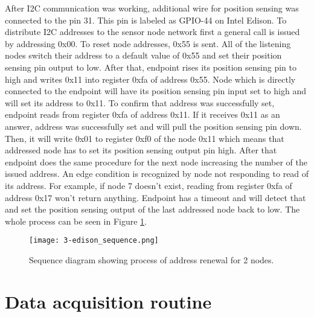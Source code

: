 After \ac{I2C} communication was working, additional wire for position sensing was connected to the pin 31. This pin is labeled as GPIO-44 on Intel Edison. To distribute \ac{I2C} addresses to the sensor node network first a general call is issued by addressing 0x00. To reset node addresses, 0x55 is sent. All of the listening nodes switch their address to a default value of 0x55 and set their position sensing pin output to low. After that, endpoint rises its position sensing pin to high and writes 0x11 into register 0xfa of address 0x55. Node which is directly connected to the endpoint will have its position sensing pin input set to high and will set its address to 0x11. To confirm that address was successfully set, endpoint reads from register 0xfa of address 0x11. If it receives 0x11 as an answer, address was successfully set and will pull the position sensing pin down. Then, it will write 0x01 to register 0xf0 of the node 0x11 which means that addressed node has to set its position sensing output pin high. After that endpoint does the same procedure for the next node increasing the number of the issued address. An edge condition is recognized by node not responding to read of its address. For example, if node 7 doesn't exist, reading from register 0xfa of address 0x17 won't return anything. Endpoint has a timeout and will detect that and set the position sensing output of the last addressed node back to low. The whole process can be seen in Figure \ref{fig:endpoint_sequence}.

\begin{figure}[h]
  \begin{center}
    \texttt{[image: 3-edison\_sequence.png]}
  \end{center}
  \caption{Sequence diagram showing process of address renewal for 2 nodes.}
  \label{fig:endpoint_sequence}
\end{figure}


\section{Data acquisition routine}

